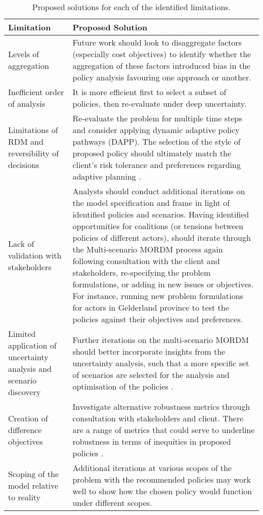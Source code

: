 \begin{table}[h]
\caption{Proposed solutions for each of the identified limitations.}
\label{tab:Proposed Solutions}
\centering
\begin{tabular}{p{}|p{}}
\textbf{Limitation} & \textbf{Proposed Solution}  \\ \hline
Levels of aggregation & Future work should look to disaggregate factors (especially cost objectives) to identify whether the aggregation of these factors introduced bias in the policy analysis favouring one approach or another. \\ \hline
Inefficient order of analysis &  It is more efficient first to select a subset of policies, then re-evaluate under deep uncertainty.\\ \hline
Limitations of RDM and reversibility of decisions & Re-evaluate the problem for multiple time steps and consider applying dynamic adaptive policy pathways (DAPP). The selection of the style of proposed policy should ultimately match the client's risk tolerance and preferences regarding adaptive planning \parencite{marchau_decision_2019}. \\ \hline
Lack of validation with stakeholders &Analysts should conduct additional iterations on the model specification and frame in light of identified policies and scenarios. Having identified opportunities for coalitions (or tensions between policies of different actors), should iterate through the Multi-scenario MORDM process again following consultation with the client and stakeholders, re-specifying the problem formulations, or adding in new issues or objectives. For instance, running new problem formulations for actors in Gelderland province to test the policies against their objectives and preferences. \\ \hline
Limited application of uncertainty analysis and scenario discovery & Further iterations on the multi-scenario MORDM should better incorporate insights from the uncertainty analysis, such that a more specific set of scenarios are selected for the analysis and optimisation of the policies \parencite{watson_incorporating_2017, eker_including_2018}. \\ \hline
Creation of difference objectives & Investigate alternative robustness metrics through consultation with stakeholders and client. There are a range of metrics that could serve to underline robustness in terms of inequities in proposed policies \parencite{mcphail_robustness_2018}. \\ \hline
Scoping of the model relative to reality & Additional iterations at various scopes of the problem with the recommended policies may work well to show how the chosen policy would function under different scopes.        \\ \hline

\end{tabular}
\end{table}
